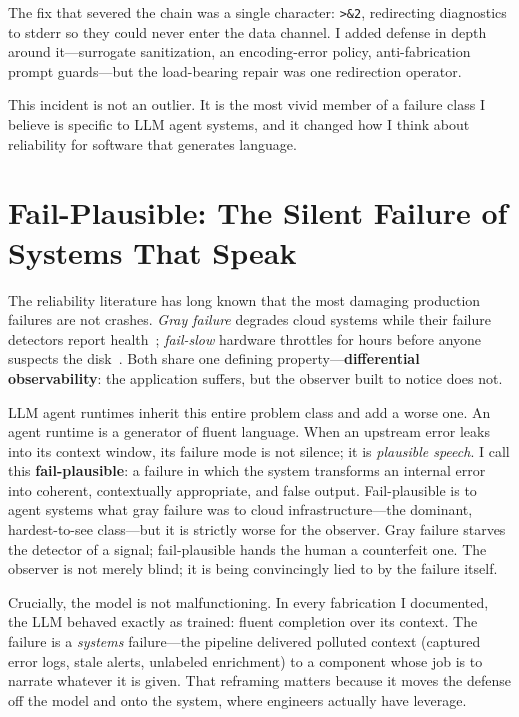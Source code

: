 \documentclass[10pt,journal]{IEEEtran}
\begin{document}
The fix that severed the chain was a single character: \texttt{>\&2},
redirecting diagnostics to stderr so they could never enter the data channel.
I added defense in depth around it---surrogate sanitization, an encoding-error
policy, anti-fabrication prompt guards---but the load-bearing repair was one
redirection operator.

This incident is not an outlier. It is the most vivid member of a failure
class I believe is specific to LLM agent systems, and it changed how I think
about reliability for software that generates language.

\section{Fail-Plausible: The Silent Failure of Systems That Speak}
The reliability literature has long known that the most damaging production
failures are not crashes. \emph{Gray failure} degrades cloud systems while
their failure detectors report health~\cite{ref1}; \emph{fail-slow} hardware
throttles for hours before anyone suspects the disk~\cite{ref2}. Both share
one defining property---\textbf{differential observability}: the application
suffers, but the observer built to notice does not.

LLM agent runtimes inherit this entire problem class and add a worse one. An
agent runtime is a generator of fluent language. When an upstream error leaks
into its context window, its failure mode is not silence; it is \emph{plausible
speech}. I call this \textbf{fail-plausible}: a failure in which the system
transforms an internal error into coherent, contextually appropriate, and
false output. Fail-plausible is to agent systems what gray failure was to
cloud infrastructure---the dominant, hardest-to-see class---but it is strictly
worse for the observer. Gray failure starves the detector of a signal;
fail-plausible hands the human a counterfeit one. The observer is not merely
blind; it is being convincingly lied to by the failure itself.

Crucially, the model is not malfunctioning. In every fabrication I documented,
the LLM behaved exactly as trained: fluent completion over its context. The
failure is a \emph{systems} failure---the pipeline delivered polluted context
(captured error logs, stale alerts, unlabeled enrichment) to a component whose
job is to narrate whatever it is given. That reframing matters because it moves
the defense off the model and onto the system, where engineers actually have
leverage.
\end{document}
